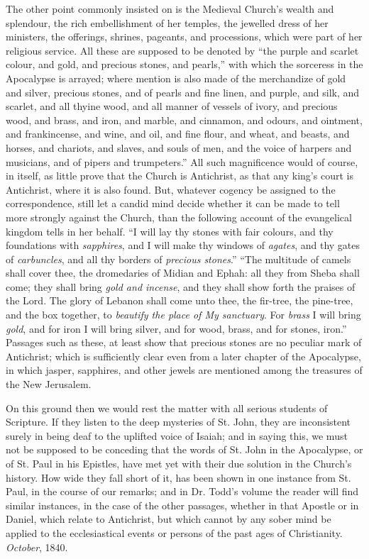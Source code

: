 The other point commonly insisted on is the Medieval Church's
wealth and splendour, the rich embellishment of her temples, the
jewelled dress of her ministers, the offerings, shrines, pageants, and
processions, which were part of her religious service. All these are
supposed to be denoted by ``the purple and scarlet colour, and
gold, and precious stones, and pearls,'' with which the sorceress
in the Apocalypse is arrayed; where mention is also made of the
merchandize of gold and silver, precious stones, and of pearls and
fine linen, and purple, and silk, and scarlet, and all thyine wood, and
all manner of vessels of ivory, and precious wood, and brass, and
iron, and marble, and cinnamon, and odours, and ointment, and
frankincense, and wine, and oil, and fine flour, and wheat, and
beasts, and horses, and chariots, and slaves, and souls of men, and
the voice of harpers and musicians, and of pipers and
trumpeters.'' All such magnificence would of course, in itself, as
little prove that the Church is Antichrist, as that any king's court
is Antichrist, where it is also found. But, whatever cogency be
assigned to the correspondence, still let a candid mind decide whether
it can be made to tell more strongly against the Church, than the
following account of the evangelical kingdom tells in her behalf.
``I will lay thy stones with fair colours, and thy foundations
with \emph{sapphires}, and I will make thy windows of \emph{agates},
and thy gates of \emph{carbuncles}, and all thy borders of \emph{precious
stones}.'' ``The multitude of camels shall cover
thee, the dromedaries of Midian and Ephah: all they from Sheba shall
come; they shall bring \emph{gold and incense}, and they shall show
forth the praises of the Lord. The glory of Lebanon shall come unto
thee, the fir-tree, the pine-tree, and the box together, to \emph{beautify
the place of My sanctuary}. For \emph{brass} I will bring \emph{gold},
and for iron I will bring silver, and for wood, brass, and for stones,
iron.'' Passages such as these, at least show that precious stones
are no peculiar mark of Antichrist; which is sufficiently clear even
from a later chapter of the Apocalypse, in which jasper, sapphires,
and other jewels are mentioned among the treasures of the New
Jerusalem.

On this ground then we would rest the matter with all serious
students of Scripture. If they listen to the deep mysteries of St.
John, they are inconsistent surely in being deaf to the uplifted voice
of Isaiah; and in saying this, we must not be supposed to be conceding
that the words of St. John in the Apocalypse, or of St. Paul in his
Epistles, have met yet with their due solution in the Church's
history. How wide they fall short of it, has been shown in one
instance from St. Paul, in the course of our remarks; and in Dr. Todd's
volume the reader will find similar instances, in the case of the
other passages, whether in that Apostle or in Daniel, which relate to
Antichrist, but which cannot by any sober mind be applied to the
ecclesiastical events or persons of the past ages of Christianity.
\emph{October}, 1840.

